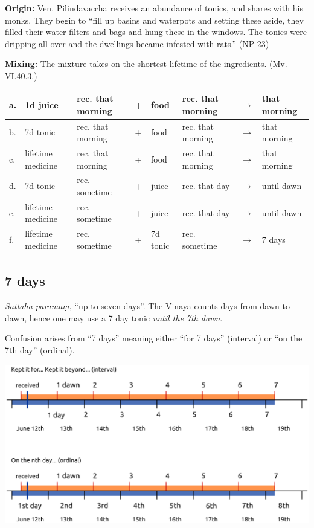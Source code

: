 \clearpage

\textbf{Origin:} Ven. Pilindavaccha receives an abundance of tonics, and
shares with his monks. They begin to ``fill up basins and waterpots and
setting these aside, they filled their water filters and bags and hung
these in the windows. The tonics were dripping all over and the
dwellings became infested with rats.''
(\href{https://suttacentral.net/pli-tv-bu-vb-np23/en/brahmali}{NP 23})

\textbf{Mixing:} The mixture takes on the shortest lifetime of the
ingredients. (Mv. VI.40.3.)

\begin{center}
\begin{tabular}{llllllll}
a. & 1d juice & rec. that morning & + & food & rec. that morning & \(\rightarrow\) & that morning\\
\hline
b. & 7d tonic & rec. that morning & + & food & rec. that morning & \(\rightarrow\) & that morning\\
\hline
c. & lifetime medicine & rec. that morning & + & food & rec. that morning & \(\rightarrow\) & that morning\\
\hline
d. & 7d tonic & rec. sometime & + & juice & rec. that day & \(\rightarrow\) & until dawn\\
\hline
e. & lifetime medicine & rec. sometime & + & juice & rec. that day & \(\rightarrow\) & until dawn\\
\hline
f. & lifetime medicine & rec. sometime & + & 7d tonic & rec. sometime & \(\rightarrow\) & 7 days\\
\end{tabular}
\end{center}

\subsection{7 days}

\emph{Sattāha paramaṃ}, ``up to seven days''. The Vinaya counts days
from dawn to dawn, hence one may use a 7 day tonic \emph{until the 7th
dawn}.

Confusion arises from ``7 days'' meaning either ``for 7 days''
(interval) or ``on the 7th day'' (ordinal).

\vspace*{\baselineskip}
\includegraphics[width=\linewidth]{../../src/includes/figures/7-days.png}

